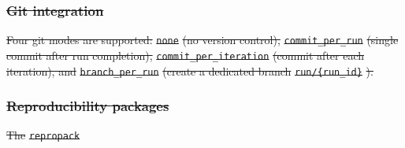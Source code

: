 \documentclass[10pt,letterpaper]{article}
\providecommand{\DIFdeltex}[1]{{\protect\color{red}\sout{#1}}}                      %
\providecommand{\DIFdelbegin}{} %
\providecommand{\DIFdel}[1]{\texorpdfstring{\DIFdeltex{#1}}{}} %
\newcommand{\DIFscaledelfig}{0.5}
\newlength{\DIFdelgraphicswidth} %
\newlength{\DIFdelgraphicsheight} %
\newcommand{\DIFdelincludegraphics}[2][]{%
\sbox{\DIFdelgraphicsbox}{\DIFOincludegraphics[#1]{#2}}%
\settoboxwidth{\DIFdelgraphicswidth}{\DIFdelgraphicsbox} %
\settoboxtotalheight{\DIFdelgraphicsheight}{\DIFdelgraphicsbox} %
\scalebox{\DIFscaledelfig}{%
\parbox[b]{\DIFdelgraphicswidth}{\usebox{\DIFdelgraphicsbox}\\[-\baselineskip] \rule{\DIFdelgraphicswidth}{0em}}\llap{\resizebox{\DIFdelgraphicswidth}{\DIFdelgraphicsheight}{%
\setlength{\unitlength}{\DIFdelgraphicswidth}%
\begin{picture}(1,1)%
\thicklines\linethickness{2pt} %
{\color[rgb]{1,0,0}\put(0,0){\framebox(1,1){}}}%
{\color[rgb]{1,0,0}\put(0,0){\line( 1,1){1}}}%
{\color[rgb]{1,0,0}\put(0,1){\line(1,-1){1}}}%
\end{picture}%
}\hspace*{3pt}}} %
} %
\DeclareRobustCommand{\DIFdelbegin}{\DIFOdelbegin \let\includegraphics\DIFdelincludegraphics} %
\begin{document}
\DIFdelbegin \subsubsection*{\DIFdel{Git integration}}
\DIFdel{Four git modes are supported: }\texttt{\DIFdel{none}} %
\DIFdel{(no version control), }\texttt{\DIFdel{commit\_per\_run}} %
\DIFdel{(single commit after run completion), }\texttt{\DIFdel{commit\_per\_iteration}} %
\DIFdel{(commit after each iteration), and }\texttt{\DIFdel{branch\_per\_run}} %
\DIFdel{(create a dedicated branch }\texttt{\DIFdel{run/\{run\_id\}}}%
\DIFdel{). }%

\subsubsection*{\DIFdel{Reproducibility packages}}
\DIFdel{The }\texttt{\DIFdel{repropack}} %
\end{document}
